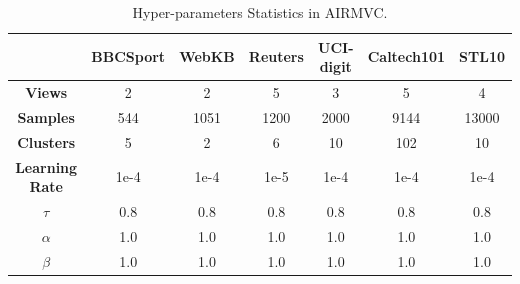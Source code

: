 \documentclass{article}
\theoremstyle{plain}
\theoremstyle{definition}
\theoremstyle{remark}
\begin{document}
\begin{table}[h]
\centering
\caption{Hyper-parameters Statistics in AIRMVC.}
\begin{tabular}{c|cccccc}
\hline
\textbf{}              & \textbf{BBCSport} & \textbf{WebKB} & \textbf{Reuters} & \textbf{UCI-digit} & \textbf{Caltech101} & \textbf{STL10} \\ \hline
\textbf{Views}         & 2                 & 2              & 5                & 3                  & 5                   & 4              \\
\textbf{Samples}       & 544               & 1051           & 1200             & 2000               & 9144                & 13000          \\
\textbf{Clusters}      & 5                 & 2              & 6                & 10                 & 102                 & 10             \\ \hline
\textbf{Learning Rate} & 1e-4              & 1e-4           & 1e-5             & 1e-4               & 1e-4                & 1e-4           \\
$\tau$                   & 0.8               & 0.8            & 0.8              & 0.8                & 0.8                 & 0.8            \\
$\alpha$                 & 1.0               & 1.0            & 1.0              & 1.0                & 1.0                 & 1.0            \\
$\beta$                  & 1.0               & 1.0            & 1.0              & 1.0                & 1.0                 & 1.0            \\ \hline
\end{tabular}
\label{hyper-para}
\end{table}
\end{document}
